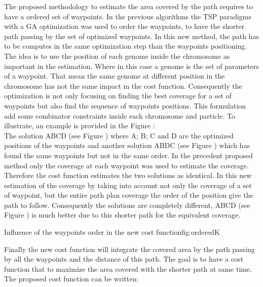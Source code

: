 The proposed methodology to estimate the area covered by the path requires to have a ordered set of waypoints.  In the previous algorithms the TSP paradigms with a GA optimization was used to order the waypoints, to have the shorter path passing by the set of optimized waypoints. In this new method, the path has to be computes in the same optimization step than the waypoints positioning. 
The idea is to use the position of each genome inside the chromosome as important in the estimation. Where in this case a genome is the set of parameters of a waypoint. That mean the same genome at different position in the chromosome has not the same impact in the cost function. Consequently the optimization is not only focusing on finding the best coverage for a set of waypoints but also find the sequence of waypoints positions. This formulation add some combinator constraints inside each chromosome and particle.
To illustrate, an example is provided in the Figure  : \\
The solution ABCD (see Figure ) where A; B; C and D are the optimized positions of the waypoints and another solution  ABDC (see Figure ) which has found the same waypoints but not in the same order. In the precedent proposed method only the coverage at each waypoint was used to estimate the coverage. Therefore the cost function estimates the two solutions as identical. 
In this new estimation of the coverage by taking into account not only the coverage of a set of waypoint, but the entire path plan coverage the order of the position give the path to follow. Consequently the solutions are completely different, ABCD (see Figure ) is much better due to this shorter path for the equivalent coverage.
  \begin{mfigures}[!]{Influence of the waypoints order in the new cost function}{fig:orderedK} \centering
\end{mfigures}   

 Finally the new cost function will integrate the covered area by the path passing  by all the waypoints and the distance of this path. The goal is to have a cost function that to maximize the area covered with the shorter path at same time.
 The proposed cost function can be written:
 
